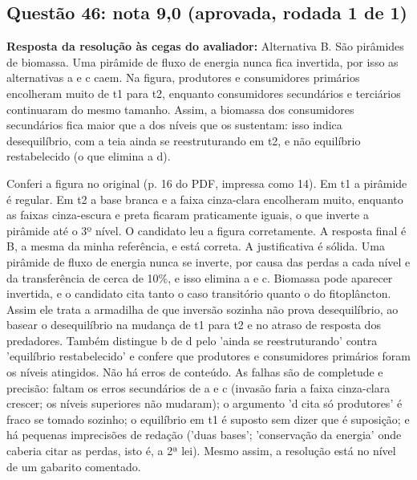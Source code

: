 \documentclass{article}%
\begin{document}
\subsection*{Questão 46: nota 9,0 (aprovada, rodada 1 de 1)}%
\textbf{Resposta da resolução às cegas do avaliador:} Alternativa B. São pirâmides de biomassa. Uma pirâmide de fluxo de energia nunca fica invertida, por isso as alternativas a e c caem. Na figura, produtores e consumidores primários encolheram muito de t1 para t2, enquanto consumidores secundários e terciários continuaram do mesmo tamanho. Assim, a biomassa dos consumidores secundários fica maior que a dos níveis que os sustentam: isso indica desequilíbrio, com a teia ainda se reestruturando em t2, e não equilíbrio restabelecido (o que elimina a d).\par %
Conferi a figura no original (p. 16 do PDF, impressa como 14). Em t1 a pirâmide é regular. Em t2 a base branca e a faixa cinza{-}clara encolheram muito, enquanto as faixas cinza{-}escura e preta ficaram praticamente iguais, o que inverte a pirâmide até o 3º nível. O candidato leu a figura corretamente.\newline%
\newline%
A resposta final é B, a mesma da minha referência, e está correta. A justificativa é sólida. Uma pirâmide de fluxo de energia nunca se inverte, por causa das perdas a cada nível e da transferência de cerca de 10\%, e isso elimina a e c. Biomassa pode aparecer invertida, e o candidato cita tanto o caso transitório quanto o do fitoplâncton. Assim ele trata a armadilha de que inversão sozinha não prova desequilíbrio, ao basear o desequilíbrio na mudança de t1 para t2 e no atraso de resposta dos predadores. Também distingue b de d pelo 'ainda se reestruturando' contra 'equilíbrio restabelecido' e confere que produtores e consumidores primários foram os níveis atingidos.\newline%
\newline%
Não há erros de conteúdo. As falhas são de completude e precisão: faltam os erros secundários de a e c (invasão faria a faixa cinza{-}clara crescer; os níveis superiores não mudaram); o argumento 'd cita só produtores' é fraco se tomado sozinho; o equilíbrio em t1 é suposto sem dizer que é suposição; e há pequenas imprecisões de redação ('duas bases'; 'conservação da energia' onde caberia citar as perdas, isto é, a 2ª lei). Mesmo assim, a resolução está no nível de um gabarito comentado.%
\end{document}

